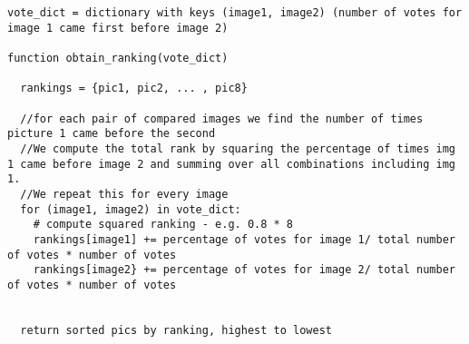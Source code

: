 \documentclass[11pt]{article}
\begin{document}
\begin{verbatim}
vote_dict = dictionary with keys (image1, image2) (number of votes for image 1 came first before image 2)

function obtain_ranking(vote_dict)

  rankings = {pic1, pic2, ... , pic8}

  //for each pair of compared images we find the number of times picture 1 came before the second
  //We compute the total rank by squaring the percentage of times img 1 came before image 2 and summing over all combinations including img 1.
  //We repeat this for every image
  for (image1, image2) in vote_dict:
    # compute squared ranking - e.g. 0.8 * 8
    rankings[image1] += percentage of votes for image 1/ total number of votes * number of votes 
    rankings[image2} += percentage of votes for image 2/ total number of votes * number of votes 


  return sorted pics by ranking, highest to lowest  
\end{verbatim}
\end{document}
